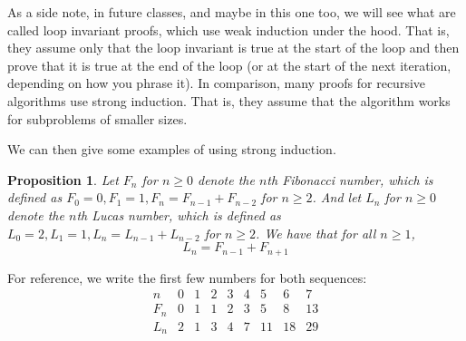 \documentclass{article}
\theoremstyle{plain}
\newtheorem{proposition}{Proposition}
\theoremstyle{definition}
\begin{document}
As a side note, in future classes, and maybe in this one too, we will see what are called loop invariant proofs, which use weak induction under the hood. That is, they assume only that the loop invariant is true at the start of the loop and then prove that it is true at the end of the loop (or at the start of the next iteration, depending on how you phrase it). In comparison, many proofs for recursive algorithms use strong induction. That is, they assume that the algorithm works for subproblems of smaller sizes.

We can then give some examples of using strong induction.

\begin{proposition}
    Let \(F_n\) for \(n \geq 0\) denote the \(n\)th Fibonacci number, which is defined as \(F_0 = 0, F_1 = 1, F_n = F_{n-1} + F_{n-2}\) for \(n \geq 2\). And let \(L_n\) for \(n \geq 0\) denote the \(n\)th Lucas number, which is defined as \(L_0 = 2, L_1 = 1, L_n = L_{n-1} + L_{n-2}\) for \(n \geq 2\). We have that for all \(n \geq 1\),
    \[L_n = F_{n-1} + F_{n+1}\]
\end{proposition}

For reference, we write the first few numbers for both sequences:
\[\begin{array}{c|c|c|c|c|c|c|c|c}
    n   & 0 & 1 & 2 & 3 & 4 & 5 & 6 & 7 \\
    \hline \hline
    F_n & 0 & 1 & 1 & 2 & 3 & 5 & 8 & 13 \\
    \hline
    L_n & 2 & 1 & 3 & 4 & 7 & 11 & 18 & 29 \\
\end{array}\]
\end{document}
